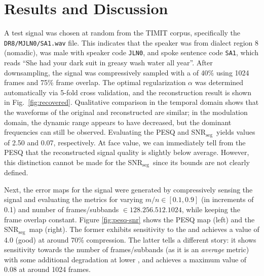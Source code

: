 \documentclass[10pt,a4paper,twoside]{article}
\newcommand{\snrseg}{SNR$_{\mathrm{seg}}$}
\begin{document}
\section{Results and Discussion}
A test signal was chosen at random from the TIMIT corpus, specifically the \texttt{DR8/MJLN0/SA1.wav} file. This indicates that the speaker was from dialect region 8 (nomadic), was male with speaker code \texttt{JLN0}, and spoke sentence code \texttt{SA1}, which reads ``She had your dark suit in greasy wash water all year''. After downsampling, the signal was compressively sampled with a  of 40\% using 1024 frames and 75\% frame overlap. The optimal regularization $\alpha$ was determined automatically via 5-fold cross validation, and the reconstruction result is shown in Fig.~\ref{fig:recovered}. Qualitative comparison in the temporal domain shows that the waveforms of the original and reconstructed are similar; in the modulation domain, the dynamic range appears to have decreased, but the dominant frequencies can still be observed. Evaluating the PESQ and \snrseg~yields values of 2.50 and 0.07, respectively. At face value, we can immediately tell from the PESQ that the reconstructed signal quality is slightly below average. However, this distinction cannot be made for the \snrseg~since its bounds are not clearly defined.

Next, the error maps for the signal were generated by compressively sensing the signal and evaluating the metrics for varying  $m/n \in [0.1, 0.9]$ (in increments of 0.1) and number of frames/subbands $\in \qty{128, 256, 512, 1024}$, while keeping the frame overlap constant. Figure \ref{fig:pesq-snr} shows the PESQ map (left) and the \snrseg~map (right). The former exhibits sensitivity to the  and achieves a value of 4.0 (good) at around 70\% compression. The latter tells a different story: it shows sensitivity towards the number of frames/subbands (as it is an \textit{average} metric) with some additional degradation at lower , and achieves a maximum value of 0.08 at around 1024 frames.
\end{document}
